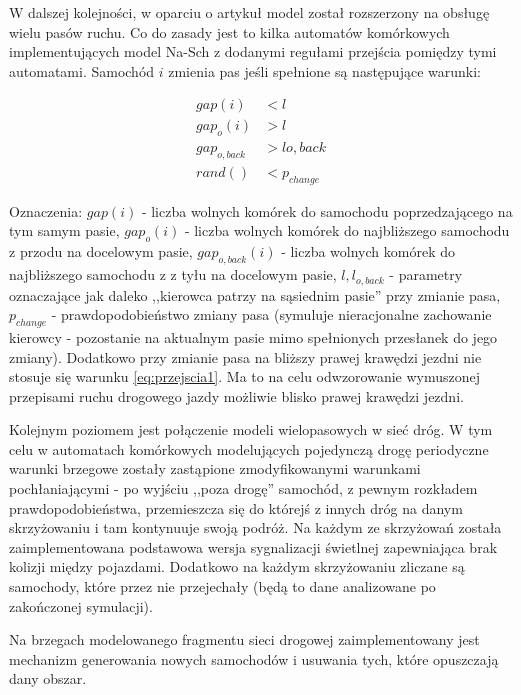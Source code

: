 \documentclass[a4paper,12pt]{article}
\begin{document}
W dalszej kolejności, w oparciu o artykuł \cite{nagel1995twolane} model został rozszerzony na obsługę wielu pasów ruchu. Co do zasady jest to kilka automatów komórkowych implementujących model Na-Sch z dodanymi regułami przejścia pomiędzy tymi automatami. Samochód $i$ zmienia pas jeśli spełnione są następujące warunki:

\begin{subequations}
\label{eq:przejscia}
\begin{align}
gap(i) &< l \label{eq:przejscia1} \\
gap_{o}(i) &> l \label{eq:przejscia2} \\
gap_{o, back} &> l{o, back} \label{eq:przejscia3} \\
rand() &< p_{change} \label{eq:przejscia4}
\end{align}
\end{subequations}

Oznaczenia: $gap(i)$ - liczba wolnych komórek do samochodu poprzedzającego na tym samym pasie, $gap_{o}(i)$ - liczba wolnych komórek do najbliższego samochodu z przodu na docelowym pasie, $gap_{o,back}(i)$ - liczba wolnych komórek do najbliższego samochodu z z tyłu na docelowym pasie, $l, l_{o,back}$ - parametry oznaczające jak daleko ,,kierowca patrzy na sąsiednim pasie'' przy zmianie pasa, $p_{change}$ - prawdopodobieństwo zmiany pasa (symuluje nieracjonalne zachowanie kierowcy - pozostanie na aktualnym pasie mimo spełnionych przesłanek do jego zmiany). Dodatkowo przy zmianie pasa na bliższy prawej krawędzi jezdni nie stosuje się warunku \ref{eq:przejscia1}. Ma to na celu odwzorowanie wymuszonej przepisami ruchu drogowego jazdy możliwie blisko prawej krawędzi jezdni.

Kolejnym poziomem jest połączenie modeli wielopasowych w sieć dróg. W tym celu w automatach komórkowych modelujących pojedynczą drogę periodyczne warunki brzegowe zostały zastąpione zmodyfikowanymi warunkami pochłaniającymi - po wyjściu ,,poza drogę'' samochód, z pewnym rozkładem prawdopodobieństwa, przemieszcza się do którejś z innych dróg na danym skrzyżowaniu i tam kontynuuje swoją podróż. Na każdym ze skrzyżowań została zaimplementowana podstawowa wersja sygnalizacji świetlnej zapewniająca brak kolizji między pojazdami. Dodatkowo na każdym skrzyżowaniu zliczane są samochody, które przez nie przejechały (będą to dane analizowane po zakończonej symulacji).

Na brzegach modelowanego fragmentu sieci drogowej zaimplementowany jest mechanizm generowania nowych samochodów i usuwania tych, które opuszczają dany obszar.
\end{document}
